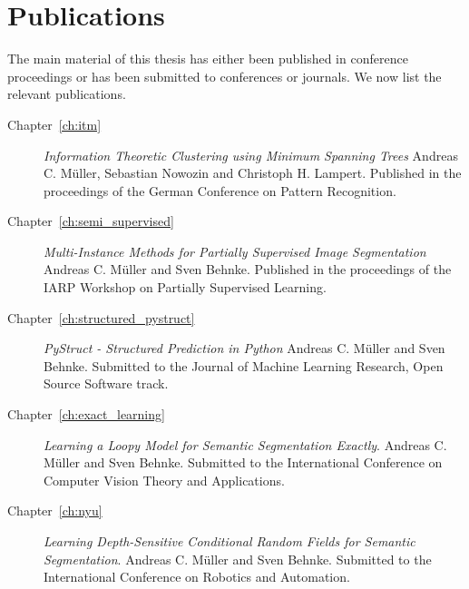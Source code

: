 \section{Publications}
The main material of this thesis has either been published in conference
proceedings or has been submitted to conferences or journals. We now list the
relevant publications.
\begin{description}
    \item[Chapter~\ref{ch:itm}] \emph{Information Theoretic Clustering using
        Minimum Spanning Trees} Andreas C. M\"uller, Sebastian Nowozin and
        Christoph H. Lampert. Published in the proceedings of the German
        Conference on Pattern Recognition.
    \item[Chapter~\ref{ch:semi_supervised}] \emph{Multi-Instance Methods for
        Partially Supervised Image Segmentation} Andreas C. M\"uller and Sven
        Behnke. Published in the proceedings of the IARP Workshop on Partially
        Supervised Learning.
    \item[Chapter~\ref{ch:structured_pystruct}] \emph{PyStruct - Structured
        Prediction in Python} Andreas C. M\"uller and Sven Behnke. Submitted to
        the Journal of Machine Learning Research, Open Source Software track.
    \item[Chapter~\ref{ch:exact_learning}] \emph{Learning a Loopy Model for
        Semantic Segmentation Exactly}. Andreas C. M\"uller and Sven Behnke.
        Submitted to the International Conference on Computer Vision Theory and
        Applications.
    \item[Chapter~\ref{ch:nyu}] \emph{Learning Depth-Sensitive Conditional
        Random Fields for Semantic Segmentation}. Andreas C. M\"uller and Sven
        Behnke. Submitted to the International Conference on Robotics and
        Automation.
\end{description}
